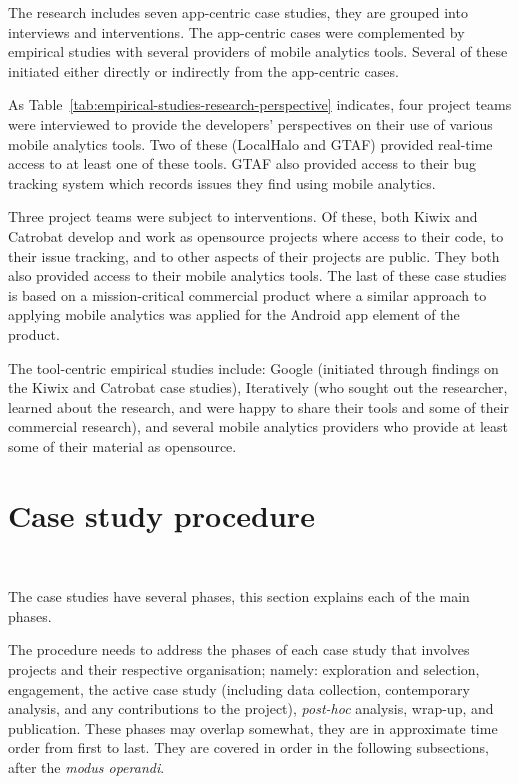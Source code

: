 The research includes seven app-centric case studies, they are grouped into interviews and interventions. The app-centric cases were complemented by empirical studies with several providers of mobile analytics tools. Several of these initiated either directly or indirectly from the app-centric cases. 

As Table~\ref{tab:empirical-studies-research-perspective} indicates, four project teams were interviewed to provide the developers' perspectives on their use of various mobile analytics tools. Two of these (LocalHalo and GTAF) provided real-time access to at least one of these tools. GTAF also provided access to their bug tracking system which records issues they find using mobile analytics.

Three project teams were subject to interventions. Of these, both Kiwix and Catrobat develop and work as opensource projects where access to their code, to their issue tracking, and to other aspects of their projects are public. They both also provided access to their mobile analytics tools. The last of these case studies is based on a mission-critical commercial product where a similar approach to applying mobile analytics was applied for the Android app element of the product.

The tool-centric empirical studies include: Google (initiated through findings on the Kiwix and Catrobat case studies), Iteratively (who sought out the researcher, learned about the research, and were happy to share their tools and some of their commercial research), and several mobile analytics providers who provide at least some of their material as opensource. 


\section{Case study procedure}~\label{section-case-study-procedure}

The case studies have several phases, this section explains each of the main phases.

The procedure needs to address the phases of each case study that involves projects and their respective organisation; namely: exploration and selection, engagement, the active case study (including data collection, contemporary analysis, and any contributions to the project), \emph{post-hoc} analysis, wrap-up, and publication. These phases may overlap somewhat, they are in approximate time order from first to last. They are covered in order in the following subsections, after the \emph{modus operandi}.

